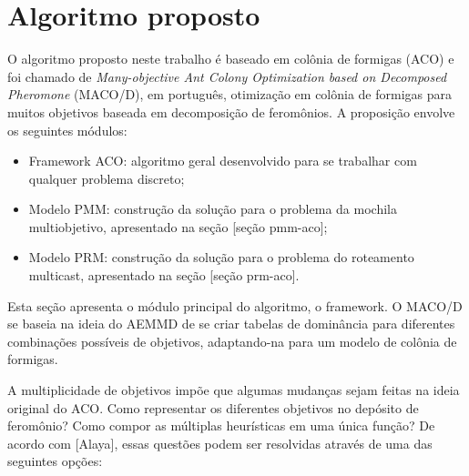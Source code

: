 \chapter[Algoritmo proposto]{Algoritmo proposto}

O algoritmo proposto neste trabalho é baseado em colônia de formigas (ACO) e foi chamado de \textit{Many-objective Ant Colony Optimization based on Decomposed Pheromone} (MACO/D), em português, otimização em colônia de formigas para muitos objetivos baseada em decomposição de feromônios. A proposição envolve os seguintes módulos:

\begin{itemize}
	\item Framework ACO: algoritmo geral desenvolvido para se trabalhar com qualquer problema discreto;
	\item Modelo PMM: construção da solução para o problema da mochila multiobjetivo, apresentado na seção [seção pmm-aco];
	\item Modelo PRM: construção da solução para o problema do roteamento multicast, apresentado na seção [seção prm-aco].
\end{itemize}

Esta seção apresenta o módulo principal do algoritmo, o framework. O MACO/D se baseia na ideia do AEMMD de se criar tabelas de dominância para diferentes combinações possíveis de objetivos, adaptando-na para um modelo de colônia de formigas.

A multiplicidade de objetivos impõe que algumas mudanças sejam feitas na ideia original do ACO. Como representar os diferentes objetivos no depósito de feromônio? Como compor as múltiplas heurísticas em uma única função? De acordo com [Alaya], essas questões podem ser resolvidas através de uma das seguintes opções:

